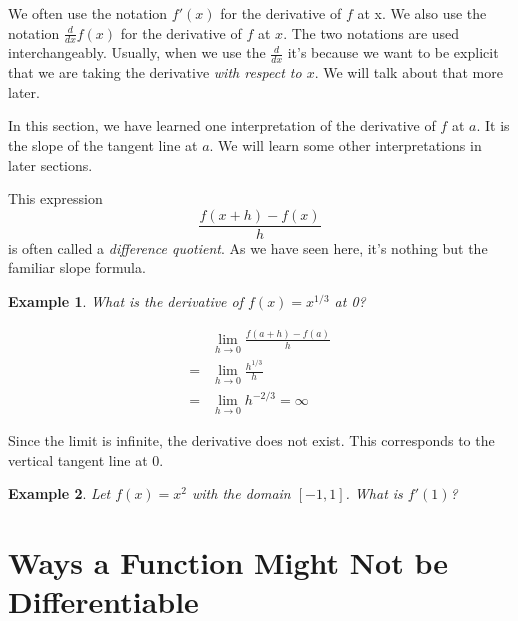 \documentclass[11pt]{book}
\newtheorem{example}{Example}
\numberwithin{example}{chapter}
\begin{document}
We often use the notation $f'(x)$ for the derivative of $f$ at x.  We also use the notation $\frac{d}{dx}f(x)$ for the derivative of $f$ at $x$.  The two notations are used interchangeably.  Usually, when we use the $\frac{d}{dx}$ it's because we want to be explicit that we are taking the derivative \emph{with respect to $x$}.  We will talk about that more later.

In this section, we have learned one interpretation of the derivative of $f$ at $a$.  It is the slope of the tangent line at $a$.  We will learn some other interpretations in later sections.   

This expression 
$$\frac{f(x+h)-f(x)}{h}$$
is often called a \emph{difference quotient}.  As we have seen here, it's nothing but the familiar slope formula.  


\begin{example}
What is the derivative of $f(x)=x^{1/3}$ at 0?
\end{example}

\begin{center}
\end{center}


\begin{align*}
&\lim_{h\to 0}\frac{f(a+h)-f(a)}{h}\\
=&\lim_{h\to 0}\frac{h^{1/3}}{h}\\
=& \lim_{h\to 0} h^{-2/3}=\infty
\end{align*}

Since the limit is infinite, the derivative does not exist.  This corresponds to the vertical tangent line at 0.

\begin{example}
Let $f(x)=x^2$ with the domain $[-1,1]$.  What is $f'(1)$?

\end{example}



\section{Ways a Function Might Not be Differentiable}
\end{document}
